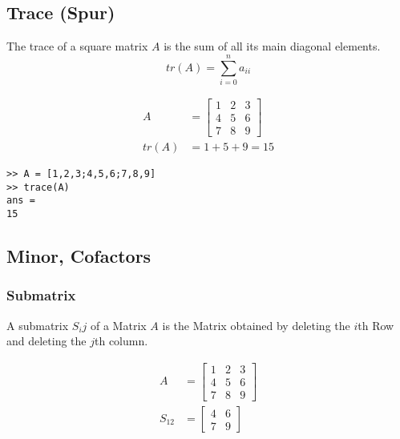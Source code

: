 \subsection{Trace (Spur)}
The trace of a square matrix \( A \) is the sum of all its main diagonal elements.
\begin{equation}
    tr(A) = \sum_{i=0}^{n} a_{ii}
\end{equation}

\begin{example}
    \begin{align*}
        A     & = \begin{bmatrix}
            1 & 2 & 3 \\ 4 & 5 & 6 \\ 7 & 8 & 9
        \end{bmatrix} \\
        tr(A) & = 1 + 5 + 9 = 15
    \end{align*}
\end{example}

\begin{matlab}
    \begin{lstlisting}
>> A = [1,2,3;4,5,6;7,8,9]
>> trace(A)
ans =
15
\end{lstlisting}
\end{matlab}
\subsection{Minor, Cofactors}\label{minor}
\subsubsection{Submatrix}
A submatrix \(S_ij\) of a Matrix \(A\) is the Matrix obtained by deleting the \(i\)th Row and deleting the \(j\)th column.
\begin{example}
    \begin{align*}
        A      & = \begin{bmatrix}
            1 & 2 & 3 \\ 4 & 5 & 6 \\ 7 & 8 & 9
        \end{bmatrix} \\
        S_{12} & = \begin{bmatrix}
            4 & 6 \\ 7 & 9
        \end{bmatrix}
    \end{align*}
\end{example}
